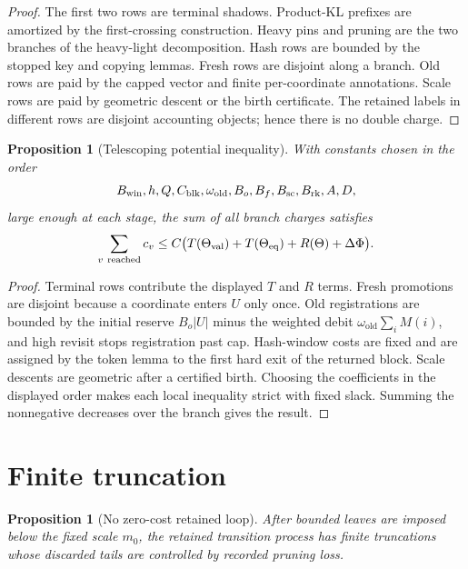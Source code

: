 \documentclass[11pt]{article}
\newtheorem{proposition}[theorem]{Proposition}
\theoremstyle{remark}
\newcommand{\old}{\mathrm{old}}
\newcommand{\scal}{\mathrm{sc}}
\newcommand{\rk}{\mathrm{rk}}
\begin{document}
\begin{proof}
The first two rows are terminal shadows.  Product-KL prefixes are amortized by the first-crossing construction.  Heavy pins and pruning are the two branches of the heavy-light decomposition.  Hash rows are bounded by the stopped key and copying lemmas.  Fresh rows are disjoint along a branch.  Old rows are paid by the capped vector and finite per-coordinate annotations.  Scale rows are paid by geometric descent or the birth certificate.  The retained labels in different rows are disjoint accounting objects; hence there is no double charge.
\end{proof}

\begin{proposition}[Telescoping potential inequality]\label{prop:app-telescope}
With constants chosen in the order
\[
        B_{\rm win},h,Q,C_{\rm blk},\omega_{\old},B_o,B_f,B_{\scal},B_{\rk},A,D,
\]
large enough at each stage, the sum of all branch charges satisfies
\[
        \sum_{v\ {\rm reached}} c_v
        \le C\bigl(T(\Theta_{\rm val})+T(\Theta_{\rm eq})+R(\Theta)+\Delta\Phi\bigr).
\]
\end{proposition}

\begin{proof}
Terminal rows contribute the displayed $T$ and $R$ terms.  Fresh promotions are disjoint because a coordinate enters $U$ only once.  Old registrations are bounded by the initial reserve $B_o|U|$ minus the weighted debit $\omega_{\old}\sum_i M(i)$, and high revisit stops registration past cap.  Hash-window costs are fixed and are assigned by the token lemma to the first hard exit of the returned block.  Scale descents are geometric after a certified birth.  Choosing the coefficients in the displayed order makes each local inequality strict with fixed slack.  Summing the nonnegative decreases over the branch gives the result.
\end{proof}

\section{Finite truncation}\label{app:finite}

\begin{proposition}[No zero-cost retained loop]\label{prop:app-no-loop}
After bounded leaves are imposed below the fixed scale $m_0$, the retained transition process has finite truncations whose discarded tails are controlled by recorded pruning loss.
\end{proposition}
\end{document}
